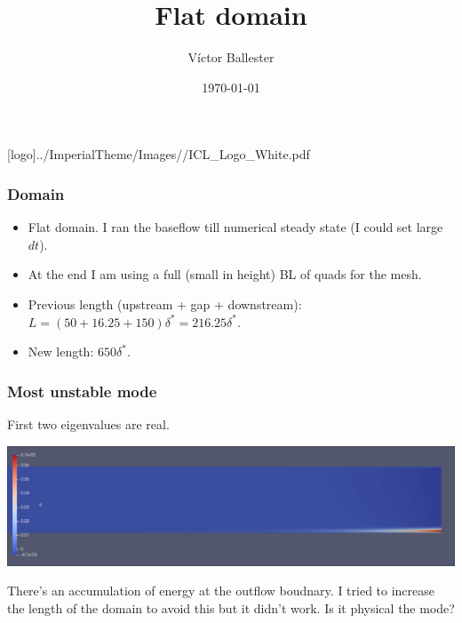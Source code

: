 \documentclass[
	aspectratio=169, %
	t, %
	onlytextwidth, %
	10pt, %
]{beamer}
\title{Flat domain} %
\subtitle{} %
\author{Víctor Ballester} %
\date{\today} %
\def\imagefolder{../ImperialTheme/Images/}
\begin{document}
\begingroup
{} %
[logo]{\imagefolder/ICL_Logo_White.pdf} %
\frame[plain, s]{\titlepage} %
\endgroup

\begin{frame}
	\frametitle{Domain}
	
	\begin{itemize}
		\item Flat domain. I ran the baseflow till numerical steady state (I could set large $dt$).
		\item At the end I am using a full (small in height) BL of quads for the mesh.
		\item Previous length (upstream + gap + downstream): $L=(50 + 16.25 + 150)\delta^*= 216.25\delta^*$.
		\item New length: $650\delta^*$.
	\end{itemize}
	
	
        
\end{frame}
\begin{frame}
	\frametitle{Most unstable mode}
	First two eigenvalues are real.

	{
	\centering
	\includegraphics[width=\linewidth]{Images/ev.png}
	}

	There's an accumulation of energy at the outflow boudnary. I tried to increase the length of the domain to avoid this but it didn't work. Is it physical the mode?
	
\end{frame}
\end{document}
